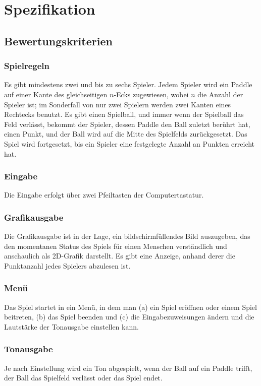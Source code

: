 \documentclass{homework-pp}
\date{\today}
\begin{document}
\makeheadline

\section{Spezifikation}


\subsection{Bewertungskriterien}
\subsubsection{Spielregeln}
Es gibt mindestens zwei und bis zu sechs Spieler. Jedem Spieler wird ein Paddle auf einer Kante des gleichseitigen $n$-Ecks zugewiesen, wobei $n$ die Anzahl der Spieler ist; im Sonderfall von nur zwei Spielern werden zwei Kanten eines Rechtecks benutzt. Es gibt einen Spielball, und immer wenn der Spielball das Feld verlässt, bekommt der Spieler, dessen Paddle den Ball zuletzt berührt hat, einen Punkt, und der Ball wird auf die Mitte des Spielfelds zurückgesetzt. Das Spiel wird fortgesetzt, bis ein Spieler eine festgelegte Anzahl an Punkten erreicht hat.
\subsubsection{Eingabe}
Die Eingabe erfolgt über zwei Pfeiltasten der Computertastatur.
\subsubsection{Grafikausgabe}
Die Grafikausgabe ist in der Lage, ein bildschirmfüllendes Bild auszugeben, das den momentanen Status des Spiels für einen Menschen verständlich und anschaulich als 2D-Grafik darstellt. Es gibt eine Anzeige, anhand derer die Punktanzahl jedes Spielers abzulesen ist.
\subsubsection{Menü}
Das Spiel startet in ein Menü, in dem man (a) ein Spiel eröffnen oder einem Spiel beitreten, (b) das Spiel beenden und (c) die Eingabezuweisungen ändern und die Lautstärke der Tonausgabe einstellen kann.
\subsubsection{Tonausgabe}
Je nach Einstellung wird ein Ton abgespielt, wenn der Ball auf ein Paddle trifft, der Ball das Spielfeld verlässt oder das Spiel endet.
\end{document}
